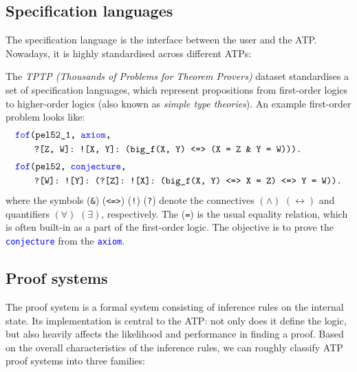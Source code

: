 \documentclass[twoside]{report}
\begin{document}
\subsection*{Specification languages}

The specification language is the interface between the user and the ATP. Nowadays, it is highly standardised across different ATPs:

\begin{example}
The \emph{TPTP (Thousands of Problems for Theorem Provers)} \cite{sutcliffe2017tptp} dataset standardises a set of specification languages, which represent propositions from first-order logics to higher-order logics (also known as \emph{simple type theories}). An example first-order problem looks like:
$$
\begin{aligned}
& \texttt{\textcolor{blue}{fof}(pel52\_1, \textcolor{blue}{axiom},} \\
& \qquad \texttt{?[Z, W]: ![X, Y]: (big\_f(X, Y) <=> (X = Z \& Y = W))).} \\[0.3em]
& \texttt{\textcolor{blue}{fof}(pel52, \textcolor{blue}{conjecture},} \\
& \qquad \texttt{?[W]: ![Y]: (?[Z]: ![X]: (big\_f(X, Y) <=> X = Z) <=> Y = W)).}
\end{aligned}
$$
where the symbols (\texttt{\&}) (\texttt{<=>}) (\texttt{!}) (\texttt{?}) denote the connectives $(\land)$ $(\leftrightarrow)$ and quantifiers $(\forall)$ $(\exists)$, respectively. The (\texttt{=}) is the usual equality relation, which is often built-in as a part of the first-order logic. The objective is to prove the \texttt{\textcolor{blue}{conjecture}} from the \texttt{\textcolor{blue}{axiom}}.
\end{example}

\subsection*{Proof systems}

The proof system is a formal system consisting of inference rules on the internal state. Its implementation is central to the ATP: not only does it define the logic, but also heavily affects the likelihood and performance in finding a proof. Based on the overall characteristics of the inference rules, we can roughly classify ATP proof systems into three families:
\end{document}
